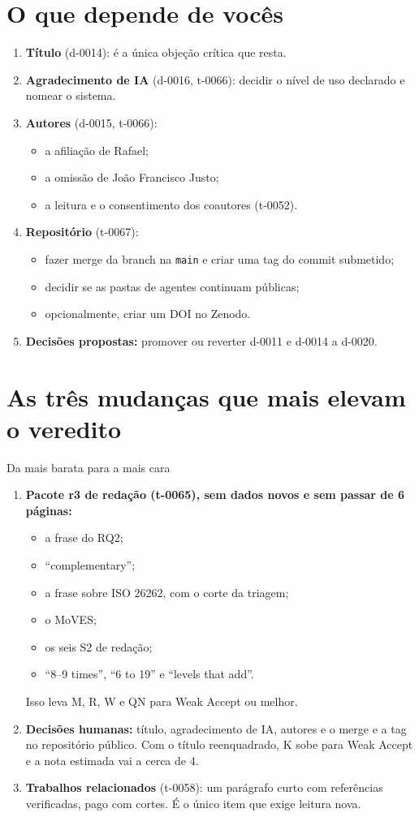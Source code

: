 \documentclass[10pt,a4paper]{article}
\begin{document}
\section{O que depende de vocês}
\begin{enumerate}
\item \textbf{Título} (d-0014): é a única objeção crítica que resta.
\item \textbf{Agradecimento de IA} (d-0016, t-0066): decidir o nível de uso declarado e nomear o sistema.
\item \textbf{Autores} (d-0015, t-0066):
  \begin{itemize}
  \item a afiliação de Rafael;
  \item a omissão de João Francisco Justo;
  \item a leitura e o consentimento dos coautores (t-0052).
  \end{itemize}
\item \textbf{Repositório} (t-0067):
  \begin{itemize}
  \item fazer merge da branch na \texttt{main} e criar uma tag do commit submetido;
  \item decidir se as pastas de agentes continuam públicas;
  \item opcionalmente, criar um DOI no Zenodo.
  \end{itemize}
\item \textbf{Decisões propostas:} promover ou reverter d-0011 e d-0014 a d-0020.
\end{enumerate}

\section{As três mudanças que mais elevam o veredito}
\begin{keybox}{Da mais barata para a mais cara}
\begin{enumerate}[leftmargin=1.4em]
\item \textbf{Pacote r3 de redação (t-0065), sem dados novos e sem passar de 6 páginas:}
  \begin{itemize}
  \item a frase do RQ2;
  \item ``complementary'';
  \item a frase sobre ISO 26262, com o corte da triagem;
  \item o MoVES;
  \item os seis S2 de redação;
  \item ``8--9 times'', ``6 to 19'' e ``levels that add''.
  \end{itemize}
  Isso leva M, R, W e QN para Weak Accept ou melhor.
\item \textbf{Decisões humanas:} título, agradecimento de IA, autores e o merge e a tag no repositório público. Com o título reenquadrado, K sobe para Weak Accept e a nota estimada vai a cerca de 4.
\item \textbf{Trabalhos relacionados} (t-0058): um parágrafo curto com referências verificadas, pago com cortes. É o único item que exige leitura nova.
\end{enumerate}
\end{keybox}
\end{document}

